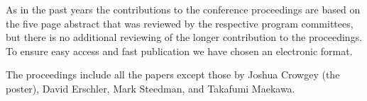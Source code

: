 As in the past years the contributions to the conference proceedings are based on the five page abstract
that was reviewed by the respective program committees, but there is no additional reviewing of the
longer contribution to the proceedings.
To ensure easy access and fast publication we have chosen an electronic format.

The proceedings include all the papers except those by Joshua Crowgey (the poster), David Erschler, Mark Steedman, and Takafumi Maekawa.
